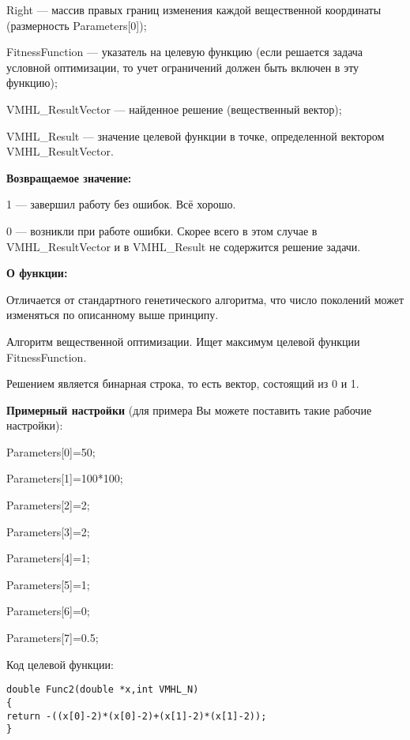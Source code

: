  Right --- массив правых границ изменения каждой вещественной координаты (размерность Parameters[0]);
 
 FitnessFunction --- указатель на целевую функцию (если решается задача условной оптимизации, то учет ограничений должен быть включен в эту функцию);
 
 VMHL\_ResultVector --- найденное решение (вещественный вектор);
 
 VMHL\_Result --- значение целевой функции в точке, определенной вектором VMHL\_ResultVector.

\textbf{Возвращаемое значение:} 

 1 --- завершил работу без ошибок. Всё хорошо.
 
 0 --- возникли при работе ошибки. Скорее всего в этом случае в VMHL\_ResultVector и в VMHL\_Result не содержится решение задачи.

\textbf{О функции:}

Отличается от стандартного генетического алгоритма, что число поколений может изменяться по описанному выше принципу.

Алгоритм вещественной оптимизации. Ищет максимум целевой функции FitnessFunction.

Решением является бинарная строка, то есть вектор, состоящий из 0 и 1.

\textbf{Примерный настройки} (для примера Вы можете поставить такие рабочие настройки):

 Parameters[0]=50;
 
Parameters[1]=100*100;

Parameters[2]=2;

Parameters[3]=2;

Parameters[4]=1;

Parameters[5]=1;

Parameters[6]=0;

Parameters[7]=0.5;

Код целевой функции:
\begin{lstlisting}[caption=Оптимизируемая функция]
double Func2(double *x,int VMHL_N)
{
return -((x[0]-2)*(x[0]-2)+(x[1]-2)*(x[1]-2));
}
\end{lstlisting}